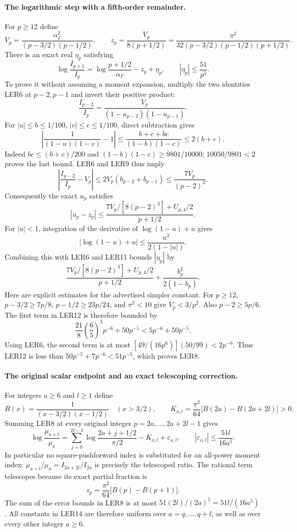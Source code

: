 \documentclass[11pt,a4paper]{article}
\begin{document}
\paragraph{The logarithmic step with a fifth-order remainder.}
For $p\ge12$ define
\[
 V_p=\frac{\alpha_\Gamma^2}{(p-3/2)(p-1/2)},\qquad
 z_p=\frac{V_p}{8(p+1/2)}
     =\frac{\pi^2}{32(p-3/2)(p-1/2)(p+1/2)}.
 \tag{LER7}
\]
There is an exact real $\eta_p$ satisfying
\[
 \boxed{\displaystyle
 \log\frac{I_{p+1}}{I_p}
 =\log\frac{p+1/2}{\alpha_\Gamma}-z_p+\eta_p,
 \qquad |\eta_p|\le\frac{51}{p^5}.}
 \tag{LER8}
\]
To prove it without assuming a moment expansion, multiply the two
identities LER6 at $p-2,p-1$ and invert their positive product:
\[
 \frac{I_{p-2}}{I_p}
 =\frac{V_p}{(1-u_{p-2})(1-u_{p-1})}.
 \tag{LER9}
\]
For $|u|\le b\le1/100$, $|v|\le c\le1/100$, direct subtraction gives
\[
 \left|\frac1{(1-u)(1-v)}-1\right|
 \le\frac{b+c+bc}{(1-b)(1-c)}\le2(b+c).
\]
Indeed $bc\le(b+c)/200$ and $(1-b)(1-c)\ge9801/10000$;
$10050/9801<2$ proves the last bound. LER6 and LER9 thus imply
\[
 \left|\frac{I_{p-2}}{I_p}-V_p\right|
 \le2V_p(b_{p-2}+b_{p-1})\le\frac{7V_p}{(p-2)^3}.
 \tag{LER10}
\]
Consequently the exact $u_p$ satisfies
\[
 |u_p-z_p|\le
 \frac{7V_p/[8(p-2)^3]+U_{p,4}/2}{p+1/2}.
 \tag{LER11}
\]
For $|u|<1$, integration of the derivative of $\log(1-u)+u$ gives
\[
 |\log(1-u)+u|\le\frac{u^2}{2(1-|u|)}.
\]
Combining this with LER6 and LER11 bounds $|\eta_p|$ by
\[
 \frac{7V_p/[8(p-2)^3]+U_{p,4}/2}{p+1/2}
 +\frac{b_p^2}{2(1-b_p)}.
 \tag{LER12}
\]
Here are explicit estimates for the advertised simpler constant.
For $p\ge12$, $p-3/2\ge7p/8$, $p-1/2\ge23p/24$, and $\pi^2<10$
give $V_p<3/p^2$. Also $p-2\ge5p/6$. The first term in LER12 is
therefore bounded by
\[
 \frac{21}{8}\left(\frac65\right)^3p^{-6}+50p^{-5}
 <5p^{-6}+50p^{-5}.
\]
Using LER6, the second term is at most
$[49/(16p^6)](50/99)<2p^{-6}$.
Thus LER12 is less than
$50p^{-5}+7p^{-6}<51p^{-5}$, which proves LER8.

\paragraph{The original scalar endpoint and an exact telescoping correction.}
For integers $a\ge6$ and $l\ge1$ define
\[
 B(x)=\frac1{(x-3/2)(x-1/2)}\quad(x>3/2),\qquad
 K_{a,l}=\frac{\pi^2}{64}\bigl[B(2a)-B(2a+2l)\bigr]>0.
 \tag{LER13}
\]
Summing LER8 at every original integer $p=2a,\ldots,2a+2l-1$ gives
\[
 \boxed{\displaystyle
 \log\frac{\mu_{a+l}}{\mu_a}
 =\sum_{j=0}^{2l-1}\log\frac{2a+j+1/2}{\pi/2}
       -K_{a,l}+\varepsilon_{a,l},\qquad
 |\varepsilon_{a,l}|\le\frac{51l}{16a^5}.}
 \tag{LER14}
\]
In particular no square-pushforward index is substituted for an
all-power moment index: $\mu_{a+l}/\mu_a=I_{2a+2l}/I_{2a}$
is precisely the telescoped ratio. The rational term telescopes
because its exact partial fraction is
\[
 z_p=\frac{\pi^2}{64}\bigl[B(p)-B(p+1)\bigr].
 \tag{LER15}
\]
The sum of the error bounds in LER8 is at most
$51(2l)/(2a)^5=51l/(16a^5)$.
All constants in LER14 are therefore uniform over $a=q,\ldots,q+l$,
as well as over every other integer $a\ge6$.
\end{document}
